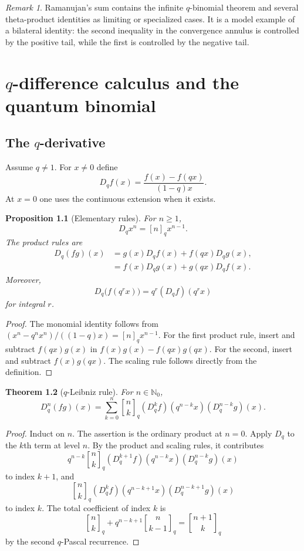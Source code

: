 \documentclass[11pt,oneside,openany]{book}
\newtheorem{theorem}{Theorem}[chapter]
\newtheorem{proposition}[theorem]{Proposition}
\theoremstyle{definition}
\theoremstyle{remark}
\newtheorem{remark}[theorem]{Remark}
\newcommand{\qbinom}[2]{\genfrac{[}{]}{0pt}{}{#1}{#2}_{q}}
\newcommand{\N}{\mathbb N}
\begin{document}
\begin{remark}
Ramanujan's sum contains the infinite $q$-binomial theorem and several theta-product identities as limiting or specialized cases.  It is a model example of a bilateral identity: the second inequality in the convergence annulus is controlled by the positive tail, while the first is controlled by the negative tail.
\end{remark}


\chapter{\texorpdfstring{$q$}{q}-difference calculus and the quantum binomial}\label{chap:qcalculus}

\section{The \texorpdfstring{$q$}{q}-derivative}

Assume $q\ne1$.  For $x\ne0$ define
\[
 D_qf(x)=\frac{f(x)-f(qx)}{(1-q)x}.
\]
At $x=0$ one uses the continuous extension when it exists.

\begin{proposition}[Elementary rules]\label{prop:qderivative-rules}
For $n\ge1$,
\[
 D_qx^n=[n]_qx^{n-1}.
\]
The product rules are
\begin{align*}
 D_q(fg)(x)&=g(x)D_qf(x)+f(qx)D_qg(x),\\
 &=f(x)D_qg(x)+g(qx)D_qf(x).
\end{align*}
Moreover,
\[
 D_q\bigl(f(q^rx)\bigr)=q^r(D_qf)(q^rx)
\]
for integral $r$.
\end{proposition}

\begin{proof}
The monomial identity follows from
\(
 (x^n-q^nx^n)/((1-q)x)=[n]_qx^{n-1}.
\)
For the first product rule, insert and subtract $f(qx)g(x)$ in
\(
 f(x)g(x)-f(qx)g(qx).
\)
For the second, insert and subtract $f(x)g(qx)$.  The scaling rule follows directly from the definition.
\end{proof}

\begin{theorem}[$q$-Leibniz rule]\label{thm:q-leibniz}
For $n\in\N_0$,
\[
 D_q^n(fg)(x)
 =\sum_{k=0}^{n}\qbinom nk
 (D_q^kf)(q^{n-k}x)(D_q^{n-k}g)(x).
\]
\end{theorem}

\begin{proof}
Induct on $n$.  The assertion is the ordinary product at $n=0$.  Apply $D_q$ to the $k$th term at level $n$.  By the product and scaling rules, it contributes
\[
 q^{n-k}\qbinom nk
 (D_q^{k+1}f)(q^{n-k}x)(D_q^{n-k}g)(x)
\]
to index $k+1$, and
\[
 \qbinom nk(D_q^kf)(q^{n-k+1}x)(D_q^{n-k+1}g)(x)
\]
to index $k$.  The total coefficient of index $k$ is
\[
 \qbinom nk+q^{n-k+1}\qbinom n{k-1}
 =\qbinom{n+1}k
\]
by the second $q$-Pascal recurrence.
\end{proof}
\end{document}
